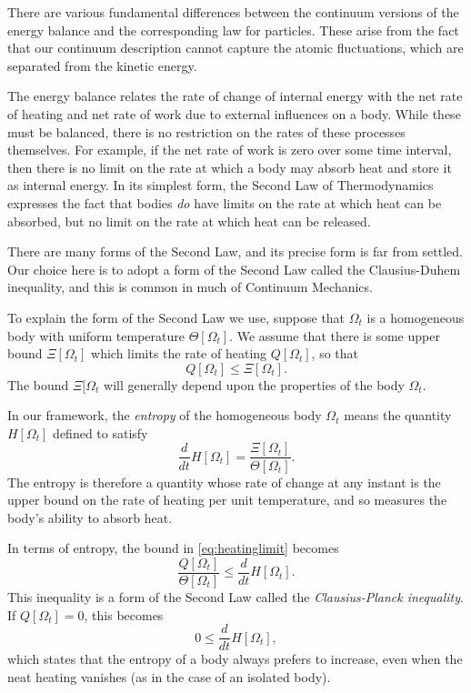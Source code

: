 \documentclass[
  letterpaper,
  DIV=11,
  numbers=noendperiod]{scrreprt}
\theoremstyle{plain}
\theoremstyle{remark}
\begin{document}
There are various fundamental differences between the continuum versions
of the energy balance and the corresponding law for particles. These
arise from the fact that our continuum description cannot capture the
atomic fluctuations, which are separated from the kinetic energy.

The energy balance relates the rate of change of internal energy with
the net rate of heating and net rate of work due to external influences
on a body. While these must be balanced, there is no restriction on the
rates of these processes themselves. For example, if the net rate of
work is zero over some time interval, then there is no limit on the rate
at which a body may absorb heat and store it as internal energy. In its
simplest form, the Second Law of Thermodynamics expresses the fact that
bodies \emph{do} have limits on the rate at which heat can be absorbed,
but no limit on the rate at which heat can be released.

There are many forms of the Second Law, and its precise form is far from
settled. Our choice here is to adopt a form of the Second Law called the
Clausius-Duhem inequality, and this is common in much of Continuum
Mechanics.

To explain the form of the Second Law we use, suppose that \(\Omega_t\)
is a homogeneous body with uniform temperature \(\Theta[\Omega_t]\). We
assume that there is some upper bound \(\Xi[\Omega_t]\) which limits the
rate of heating \(Q[\Omega_t]\), so that \[\label{eq:heatinglimit}
  Q[\Omega_t]\leq \Xi[\Omega_t].\] The bound \(\Xi[\Omega_t\) will
generally depend upon the properties of the body \(\Omega_t\).

In our framework, the \emph{entropy} of the homogeneous body
\(\Omega_t\) means the quantity \(H[\Omega_t]\) defined to satisfy
\[\frac{d}{dt}H[\Omega_t] = \frac{\Xi[\Omega_t]}{\Theta[\Omega_t]}.\]
The entropy is therefore a quantity whose rate of change at any instant
is the upper bound on the rate of heating per unit temperature, and so
measures the body's ability to absorb heat.

In terms of entropy, the bound in
\hyperref[eq:heatinglimit]{{[}eq:heatinglimit{]}} becomes
\[\label{eq:ClausiusPlanck}
  \frac{Q[\Omega_t]}{\Theta[\Omega_t]}\leq \frac{d}{dt}H[\Omega_t].\]
This inequality is a form of the Second Law called the
\emph{Clausius-Planck inequality}. If \(Q[\Omega_t]=0\), this becomes
\[0\leq \frac{d}{dt}H[\Omega_t],\] which states that the entropy of a
body always prefers to increase, even when the neat heating vanishes (as
in the case of an isolated body).
\end{document}

